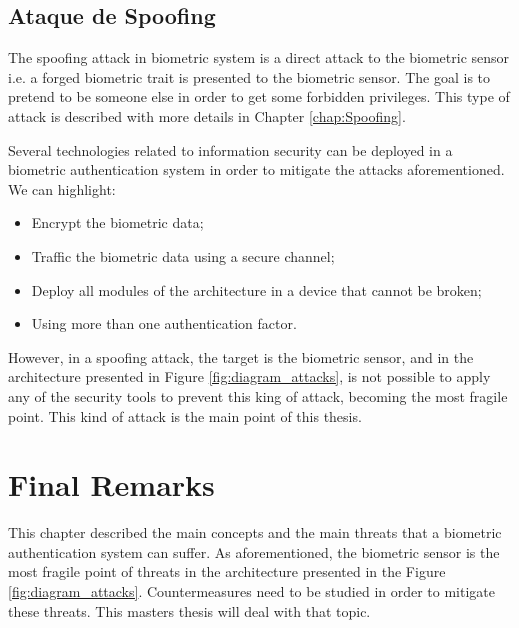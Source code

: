 \subsection{Ataque de Spoofing}

The spoofing attack in biometric system is a direct attack to the biometric sensor i.e. a forged biometric trait is presented to the biometric sensor. The goal is to pretend to be someone else in order to get some forbidden privileges. This type of attack is described with more details in Chapter \ref{chap:Spoofing}.

Several technologies related to information security can be deployed in a biometric authentication system in order to mitigate the attacks aforementioned. We can highlight:
\begin{itemize}
        \item Encrypt the biometric data;
        \item Traffic the biometric data using a secure channel;
        \item Deploy all modules of the architecture in a device that cannot be broken;
        \item Using more than one authentication factor.
\end{itemize}
However, in a spoofing attack, the target is the biometric sensor, and in the architecture presented in Figure \ref{fig:diagram_attacks}, is not possible to apply any of the security tools to prevent this king of attack, becoming the most fragile point. This kind of attack is the main point of this thesis.

\section{Final Remarks}
\label{sec:FinalRemarks}

This chapter described the main concepts and the main threats that a biometric authentication system can suffer. As aforementioned, the biometric sensor is the most fragile point of threats in the architecture presented in the Figure \ref{fig:diagram_attacks}. Countermeasures need to be studied in order to mitigate these threats. This masters thesis will deal with that topic.


